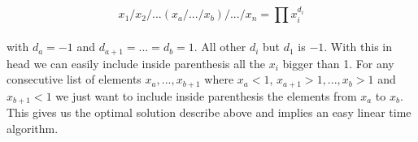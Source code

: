 \[x_1/x_2/...(x_a/.../x_b)/.../x_n = \prod x_i^{d_i}\]

\paragraph{}
with $d_a = -1$ and $d_{a+1} = ... = d_b = 1$. All other $d_i$ but $d_1$ is $-1$. With this in head we can easily include inside parenthesis all the $x_i$ bigger than 1. For any consecutive list of elements $x_a,...,x_{b+1}$ where $x_a < 1$, $x_{a+1}>1,...,x_b>1$ and $x_{b+1}<1$ we just want to include inside parenthesis the elements from $x_a$ to $x_b$. This gives us the optimal solution describe above and implies an easy linear time algorithm.




